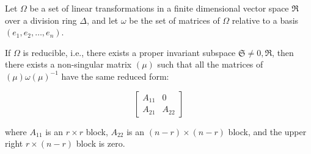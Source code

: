 Let $\Omega$ be a set of linear transformations in a finite dimensional vector space $\Re$ over a division ring $\Delta$, and let $\omega$ be the set of matrices of $\Omega$ relative to a basis $(e_1, e_2, \ldots, e_n)$.

If $\Omega$ is reducible, i.e., there exists a proper invariant subspace $\mathfrak{S} \neq 0, \Re$, then there exists a non-singular matrix $(\mu)$ such that all the matrices of $(\mu)\omega(\mu)^{-1}$ have the same reduced form:

$$\begin{bmatrix}
A_{11} & 0 \\
A_{21} & A_{22}
\end{bmatrix}$$

where $A_{11}$ is an $r \times r$ block, $A_{22}$ is an $(n-r) \times (n-r)$ block, and the upper right $r \times (n-r)$ block is zero.
